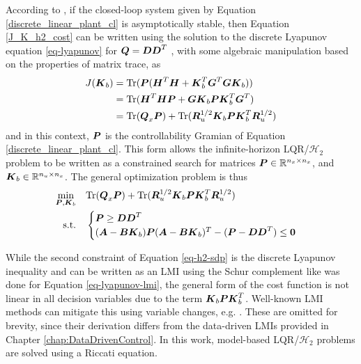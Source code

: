 According to \cite{haddad1991mixed}, if the closed-loop system given by Equation \eqref{discrete_linear_plant_cl} is asymptotically stable, then Equation \eqref{J_K_h2_cost} can be written using the solution to the discrete Lyapunov equation \eqref{eq-lyapunov} for $\vb*{Q} = \vb*{D}\vb*{D}^{T}$ \cite{feron1992numerical, chen2012optimal, de2019formulas}, with some algebraic manipulation based on the properties of matrix trace, as
\begin{equation}
\label{J_K_h2_cost_TrQR}
\begin{aligned}
	J(\vb*{K}_{b}) &= \text{Tr}(\vb*{P}(\vb*{H}^{T}\vb*{H} + \vb*{K}_{b}^{T}\vb*{G}^{T}\vb*{G}\vb*{K}_{b}))\\
	&= \text{Tr}(\vb*{H}^{T}\vb*{H}\vb*{P} + \vb*{G}\vb*{K}_{b}\vb*{P}\vb*{K}_{b}^{T}\vb*{G}^{T})\\
	&= \text{Tr}(\vb*{Q}_{x}\vb*{P}) + \text{Tr}(\vb*{R}_{u}^{1/2}\vb*{K}_{b}\vb*{P}\vb*{K}_{b}^{T}\vb*{R}_{u}^{1/2})\\
\end{aligned}
\end{equation}
and in this context, $\vb*{P}$ is the controllability Gramian of Equation \eqref{discrete_linear_plant_cl}.  This form allows the infinite-horizon LQR/$\mathcal{H}_{2}$ problem to be written as a constrained search for matrices $\vb*{P} \in \mathbb{R}^{n_{x} \times n_{x}}$, and $\vb*{K}_{b} \in \mathbb{R}^{n_{u} \times n_{x}}$.  The general optimization problem is thus
\begin{equation}
\label{eq-h2-sdp}
\begin{aligned}
	\underset{\vb*{P}, \vb*{K}_{b}}{\min} \quad & \text{Tr}(\vb*{Q}_{x}\vb*{P})
		+ \text{Tr}(\vb*{R}_{u}^{1/2}\vb*{K}_{b}\vb*{P}\vb*{K}_{b}^{T}\vb*{R}_{u}^{1/2})\\
	\textrm{s.t.} \quad & \begin{cases}
		\vb*{P} \geq \vb*{D}\vb*{D}^{T}\\
		(\vb*{A} - \vb*{B}\vb*{K}_{b})\vb*{P}(\vb*{A} - \vb*{B}\vb*{K}_{b})^{T} - (\vb*{P} - \vb*{D}\vb*{D}^{T}) \leq \vb*{0}\\
	\end{cases}\\
\end{aligned}
\end{equation}

While the second constraint of Equation \eqref{eq-h2-sdp} is the discrete Lyapunov inequality and can be written as an LMI using the Schur complement like was done for Equation \eqref{eq-lyapunov-lmi}, the general form of the cost function is not linear in all decision variables due to the term $\vb*{K}_{b}\vb*{P}\vb*{K}_{b}^{T}$.  Well-known LMI methods can mitigate this using variable changes, e.g. \cite{berkenkamp2015derivation, berkenkamp2015safe, caverly2019lmi}.  These are omitted for brevity, since their derivation differs from the data-driven LMIs provided in Chapter \ref{chap:DataDrivenControl}.  In this work, model-based LQR/$\mathcal{H}_{2}$ problems are solved using a Riccati equation.
